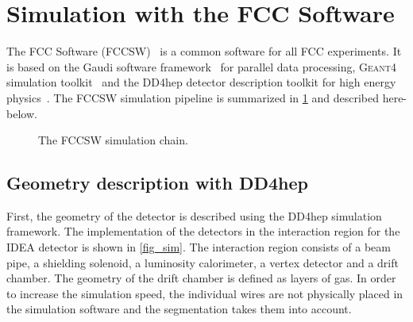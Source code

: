 \documentclass{article}
\begin{document}
\section{Simulation with the FCC Software}

The FCC Software (FCCSW)~\cite{FCCSW} is a common software for all FCC experiments. It is based on the Gaudi software framework~\cite{Gaudi} for parallel data processing, \textsc{Geant4} simulation toolkit~\cite{Geant4} and the DD4hep detector description toolkit for high energy physics~\cite{DD4hep}. The FCCSW simulation pipeline is summarized in \cref{simu_chain} and described here-below.

\begin{figure}[!t]
\centering
\caption{The FCCSW simulation chain.}
\label{simu_chain}
\end{figure}


\subsection{Geometry description with DD4hep}
First, the geometry of the detector is described using the DD4hep simulation framework. The implementation of the detectors in the interaction region for the IDEA detector is shown in \cref{fig_sim}. The interaction region consists of a beam pipe, a shielding solenoid, a luminosity calorimeter, a vertex detector and a drift chamber. The geometry of the drift chamber is defined as layers of gas. In order to increase the simulation speed, the individual wires are not physically placed in the simulation software and the segmentation takes them into account.
\end{document}
